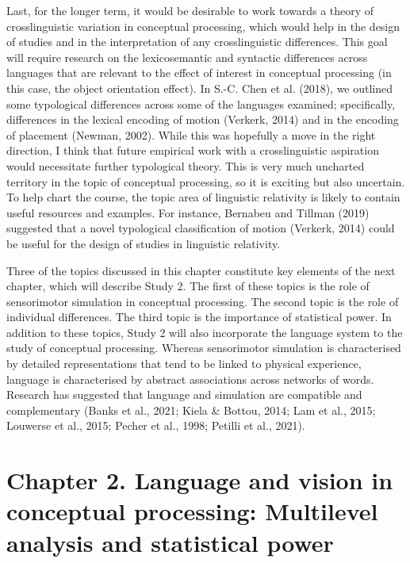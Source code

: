 \documentclass[
  12pt,
  man,floatsintext]{apa7}
\begin{document}
Last, for the longer term, it would be desirable to work towards a theory of crosslinguistic variation in conceptual processing, which would help in the design of studies and in the interpretation of any crosslinguistic differences. This goal will require research on the lexicosemantic and syntactic differences across languages that are relevant to the effect of interest in conceptual processing (in this case, the object orientation effect). In S.-C. Chen et al. (2018), we outlined some typological differences across some of the languages examined; specifically, differences in the lexical encoding of motion (Verkerk, 2014) and in the encoding of placement (Newman, 2002). While this was hopefully a move in the right direction, I think that future empirical work with a crosslinguistic aspiration would necessitate further typological theory. This is very much uncharted territory in the topic of conceptual processing, so it is exciting but also uncertain. To help chart the course, the topic area of linguistic relativity is likely to contain useful resources and examples. For instance, Bernabeu and Tillman (2019) suggested that a novel typological classification of motion (Verkerk, 2014) could be useful for the design of studies in linguistic relativity.

Three of the topics discussed in this chapter constitute key elements of the next chapter, which will describe Study 2. The first of these topics is the role of sensorimotor simulation in conceptual processing. The second topic is the role of individual differences. The third topic is the importance of statistical power. In addition to these topics, Study 2 will also incorporate the language system to the study of conceptual processing. Whereas sensorimotor simulation is characterised by detailed representations that tend to be linked to physical experience, language is characterised by abstract associations across networks of words. Research has suggested that language and simulation are compatible and complementary (Banks et al., 2021; Kiela \& Bottou, 2014; Lam et al., 2015; Louwerse et al., 2015; Pecher et al., 1998; Petilli et al., 2021).

\clearpage

\hypertarget{chapter-2.-language-and-vision-in-conceptual-processing-multilevel-analysis-and-statistical-power}{%
\section{Chapter 2. Language and vision in conceptual processing: Multilevel analysis and statistical power}\label{chapter-2.-language-and-vision-in-conceptual-processing-multilevel-analysis-and-statistical-power}}
\end{document}
